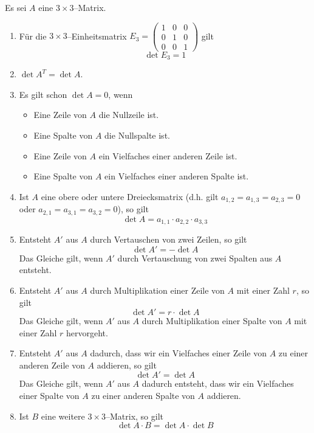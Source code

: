 \begin{regel}\label{det_3_rule} Es sei $A$ eine $3 \times 3$--Matrix. 

\begin{enumerate}
\item Für die $3 \times 3$--Einheitsmatrix
$E_3 = \left( \begin{smallmatrix} 1 & 0 & 0 \\ 0 & 1 & 0 \\ 0 & 0 & 1 \end{smallmatrix} \right)$ gilt
  	$$ \det{E_3} = 1 $$
\item $\det{A^T} = \det{A}$.
\item Es gilt schon $\det{A} = 0$, wenn 

\begin{itemize}
\item Eine Zeile von $A$ die Nullzeile ist.
\item Eine Spalte von $A$ die Nullspalte ist.
\item Eine Zeile von $A$ ein Vielfaches einer anderen Zeile ist.
\item Eine Spalte von $A$ ein Vielfaches einer anderen Spalte ist. 
\end{itemize}
\item  Ist $A$ eine obere oder untere Dreiecksmatrix (d.h. gilt $a_{1,2} = a_{1,3} = a_{2,3} = 0$ 
oder $a_{2,1} = a_{3,1} = a_{3,2} = 0$), so gilt
  	$$ \det{A} = a_{1,1} \cdot a_{2,2} \cdot a_{3,3} $$
\item Entsteht $A'$ aus $A$ durch Vertauschen von zwei Zeilen, so gilt
  	$$ \det{A'} = - \det{A} $$
Das Gleiche gilt, wenn $A'$ durch Vertauschung von zwei Spalten aus $A$ entsteht.
\item Entsteht $A'$ aus $A$ durch Multiplikation einer Zeile von $A$ mit einer Zahl $r$, so gilt
  	$$ \det{A'} = r \cdot \det{A} $$
Das Gleiche gilt, wenn $A'$ aus $A$ durch Multiplikation einer Spalte von $A$ mit 
einer Zahl $r$ hervorgeht.
\item Entsteht $A'$ aus $A$ dadurch, dass wir ein 
Vielfaches einer Zeile von $A$ zu einer anderen Zeile von $A$ addieren, so gilt
  	$$ \det{A'} =  \det{A} $$
Das Gleiche gilt, wenn $A'$ aus $A$ dadurch entsteht, dass wir ein Vielfaches einer Spalte von 
$A$ zu einer anderen Spalte von $A$ addieren.
\item Ist $B$ eine weitere $3 \times 3$--Matrix, so gilt
  	$$ \det{ A \cdot B } = \det{A} \cdot \det{B} $$
\end{enumerate}
\end{regel}

